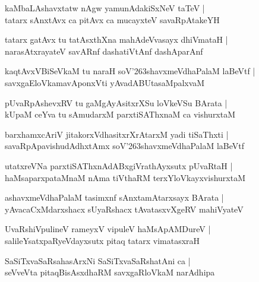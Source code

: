 \documentclass[twoside,12pt,openright]{book}
\def\S{\char'263}
\newcounter{shloka}[chapter]
\begin{document}
\begin{shloka}
kaMbaLAshavxtatw nAgw yamunAdakiSxNeV taTeV |\\
tatarx sAnxtAvx ca pitAvx ca mucayxteV savaRpAtakeYH 
\end{shloka}

\begin{shloka}
tatarx gatAvx tu tatAsxthXna mahAdeVvasayx dhiVmataH |\\
narasAtxrayateV savARnf dashatiVtAnf dashAparAnf
\end{shloka}

\begin{shloka}
kaqtAvxVBiSeVkaM tu naraH soV\S shavxmeVdhaPalaM laBeVtf |\\
savxgaEloVkamavAponxVti yAvadABUtasaMpalxvaM 
\end{shloka}

\begin{shloka}
pUvaRpAshevxRV tu gaMgAyAsitxrXSu loVkeVSu BArata |\\
kUpaM ceYva tu sAmudarxM parxtiSAThxnaM ca vishurxtaM 
\end{shloka}

\begin{shloka}
barxhamxcAriV jitakorxVdhasitxrXrAtarxM yadi tiSaThxti |\\
savaRpApavishudAdhxtAmx soV\S shavxmeVdhaPalaM laBeVtf 
\end{shloka}

\begin{shloka}
utatxreVNa parxtiSAThxnAdABxgiVrathAyxsutx pUvaRtaH |\\
haMsaparxpataMnaM nAma tiVthaRM terxYloVkayxvishurxtaM 
\end{shloka}

\begin{shloka}
ashavxmeVdhaPalaM tasimxnf sAnxtamAtarxsayx BArata |\\
yAvacaCxMdarxshacx sUyaRshacx tAvatasxvXgeRV mahiVyateV
\end{shloka}

\begin{shloka}
UvaRshiVpulineV rameyxV vipuleV haMsApAMDureV |\\
salileYsatxpaRyeVdayxsutx pitaq tatarx vimatasxraH 
\end{shloka}

\begin{shloka}
SaSiTxvaSaRsahasArxNi SaSiTxvaSaRshatAni ca |\\
seVveVta pitaqBisAsxdhaRM savxgaRloVkaM narAdhipa 
\end{shloka}
\end{document}
